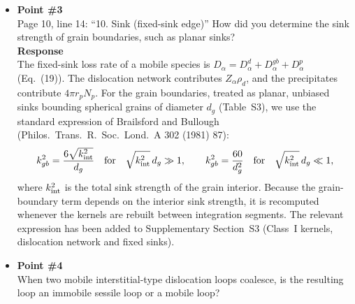 \documentclass{article}
\newif\ifshowauthornotes
\newcommand{\authornote}[1]{\ifshowauthornotes{\color{red}\ [\textbf{Author action:} #1]}\fi}
\begin{document}
\begin{itemize}
\authornote{The word ``segregation'' is still present in edge class (6) of Section~2.3 in the September 17 PDF; replace it as described.}

\item \textbf{Point \#3}\\
Page 10, line 14: ``10. Sink (fixed-sink edge)'' How did you determine the sink strength of grain boundaries, such as planar sinks?\\

\textbf{Response}\\
The fixed-sink loss rate of a mobile species is $D_\alpha = D_\alpha^{d} + D_\alpha^{gb} + D_\alpha^{p}$ (Eq.~(19)). The dislocation network contributes $Z_\alpha\rho_d$, and the precipitates contribute $4\pi r_p N_p$. For the grain boundaries, treated as planar, unbiased sinks bounding spherical grains of diameter $d_g$ (Table~S3), we use the standard expression of Brailsford and Bullough (Philos.\ Trans.\ R.\ Soc.\ Lond.\ A 302 (1981) 87):
\[
k_{gb}^2 = \frac{6\sqrt{k_{\rm int}^2}}{d_g}\quad\text{for}\quad \sqrt{k_{\rm int}^2}\,d_g \gg 1,\qquad
k_{gb}^2 = \frac{60}{d_g^2}\quad\text{for}\quad \sqrt{k_{\rm int}^2}\,d_g \ll 1,
\]
where $k_{\rm int}^2$ is the total sink strength of the grain interior. Because the grain-boundary term depends on the interior sink strength, it is recomputed whenever the kernels are rebuilt between integration segments. The relevant expression has been added to Supplementary Section~S3 (Class~I kernels, dislocation network and fixed sinks).

\authornote{Confirm which grain-boundary sink-strength expression RadCluster actually uses (e.g., $6\sqrt{k^2}/d_g$, $15/R^2$, or $60/d_g^2$) and whether it is recomputed with the evolving interior sink strength; edit the equation above and add it to S3, since it is not in the current PDF.}

\item \textbf{Point \#4}\\
When two mobile interstitial-type dislocation loops coalesce, is the resulting loop an immobile sessile loop or a mobile loop?\\


\end{itemize}
\end{document}
